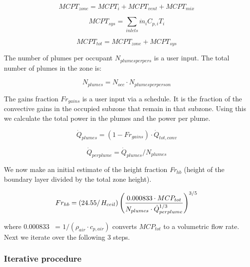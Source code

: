 {\begin{equation}
MCP{T_{zone}} = MCP{T_i} + MCP{T_{vent}} + MCP{T_{mix}}
\end{equation}

\begin{equation}
MCP{T_{sys}} = \sum\limits_{inlets} {{{\dot m}_i}} {C_{p,i}}{T_i}
\end{equation}

\begin{equation}
MCP{T_{tot}} = MCP{T_{zone}} + MCP{T_{sys}}
\end{equation}

The number of plumes per occupant \({N_{plumesperpers}}\) is a user input. The total number of plumes in the zone is:

\begin{equation}
{N_{plumes}} = {N_{occ}} \cdot {N_{plumesperperson}}
\end{equation}

The gains fraction \(F{r_{gains}}\) is a user input via a schedule. It is the fraction of the convective gains in the occupied subzone that remain in that subzone. Using this we calculate the total power in the plumes and the power per plume.

\begin{equation}
{\dot Q_{plumes}} = (1 - F{r_{gains}}) \cdot {\dot Q_{tot,conv}}
\end{equation}

\begin{equation}
{\dot Q_{perplume}} = {\dot Q_{plumes}}/{N_{plumes}}
\end{equation}

We now make an initial estimate of the height fraction \emph{Fr\(_{hb}\)} (height of the boundary layer divided by the total zone height).

\begin{equation}
F{r_{hb}} = \left( {{{24.55} \mathord{\left/ {\vphantom {{24.55} {{H_{ceil}}}}} \right. } {{H_{ceil}}}}} \right){\left( {\frac{{0.000833 \cdot MC{P_{tot}}}}{{{N_{plumes}} \cdot \dot Q_{perplume}^{1/3}}}} \right)^{3/5}}
\label{eq:RoomAirHeightBoundaryLayer}
\end{equation}

where 0.000833~ = \(1/({\rho_{air}} \cdot {c_{p,air}})\) converts \(MC{P_{tot}}\) to a volumetric flow rate. Next we iterate over the following 3 steps.

\subsubsection{Iterative procedure}\label{iterative-procedure}

}
